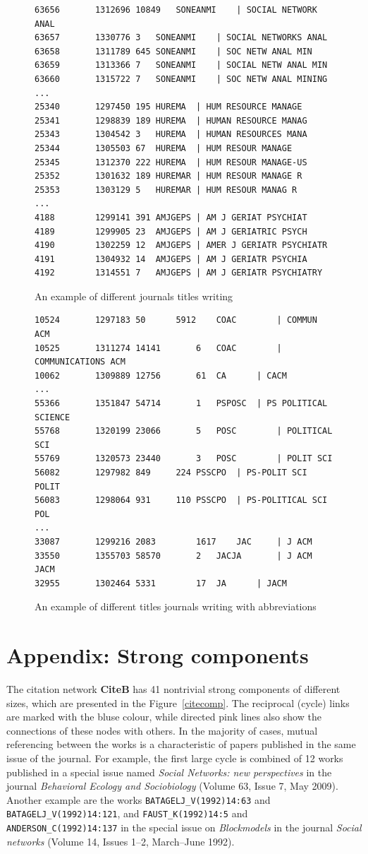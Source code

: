 \documentclass[11pt]{article} %
\begin{document}
\begin{figure}
\renewcommand{\baselinestretch}{0.8}
\scriptsize
\begin{verbatim}
63656		1312696	10849	SONEANMI	| SOCIAL NETWORK ANAL
63657		1330776	3	SONEANMI	| SOCIAL NETWORKS ANAL
63658		1311789	645	SONEANMI	| SOC NETW ANAL MIN
63659		1313366	7	SONEANMI	| SOCIAL NETW ANAL MIN
63660		1315722	7	SONEANMI	| SOC NETW ANAL MINING
...
25340		1297450	195	HUREMA	| HUM RESOURCE MANAGE
25341		1298839	189	HUREMA	| HUMAN RESOURCE MANAG
25343		1304542	3	HUREMA	| HUMAN RESOURCES MANA
25344		1305503	67	HUREMA	| HUM RESOUR MANAGE
25345		1312370	222	HUREMA	| HUM RESOUR MANAGE-US
25352		1301632	189	HUREMAR	| HUM RESOUR MANAGE R
25353		1303129	5	HUREMAR	| HUM RESOUR MANAG R
...
4188		1299141	391	AMJGEPS	| AM J GERIAT PSYCHIAT
4189		1299905	23	AMJGEPS	| AM J GERIATRIC PSYCH
4190		1302259	12	AMJGEPS	| AMER J GERIATR PSYCHIATR
4191		1304932	14	AMJGEPS	| AM J GERIATR PSYCHIA
4192		1314551	7	AMJGEPS	| AM J GERIATR PSYCHIATRY
\end{verbatim}
\caption{An example of different journals titles writing}\label{jour1}
\end{figure}

\begin{figure}
\renewcommand{\baselinestretch}{0.8}
\scriptsize
\begin{verbatim}
10524		1297183	50		5912	COAC		| COMMUN ACM
10525		1311274	14141		6	COAC		| COMMUNICATIONS ACM
10062		1309889	12756		61	CA		| CACM
...
55366		1351847	54714		1	PSPOSC 	| PS POLITICAL SCIENCE
55768		1320199	23066		5	POSC		| POLITICAL SCI
55769		1320573	23440		3	POSC		| POLIT SCI
56082		1297982	849		224	PSSCPO	| PS-POLIT SCI POLIT
56083		1298064	931		110	PSSCPO	| PS-POLITICAL SCI POL
...
33087		1299216	2083		1617	JAC		| J ACM
33550		1355703	58570		2	JACJA		| J ACM JACM
32955		1302464	5331		17	JA		| JACM
\end{verbatim}
\caption{An example of different titles journals writing with abbreviations}\label{jour2}
\end{figure}


\section{Appendix: Strong components}

The citation network \textbf{CiteB} has 41 nontrivial strong components of different sizes, which are presented in the  Figure~\ref{citecomp}. The reciprocal (cycle) links are marked with the bluse colour, while directed pink lines also show the connections of these nodes with others. In the majority of cases, mutual referencing between the works is a characteristic of papers published in the same issue of the journal. For example, the first large cycle is combined of 12 works published in a special issue named \textit{Social Networks: new perspectives} in the journal \textit{Behavioral Ecology and Sociobiology} (Volume 63, Issue 7, May 2009). Another example are the works \texttt {BATAGELJ\_V(1992)14:63} and \texttt {BATAGELJ\_V(1992)14:121}, and \texttt {FAUST\_K(1992)14:5} and \texttt {ANDERSON\_C(1992)14:137} in the special issue on \textit{Blockmodels} in the journal \textit{Social networks} (Volume 14, Issues 1–2, March–June 1992). \medskip
\end{document}
